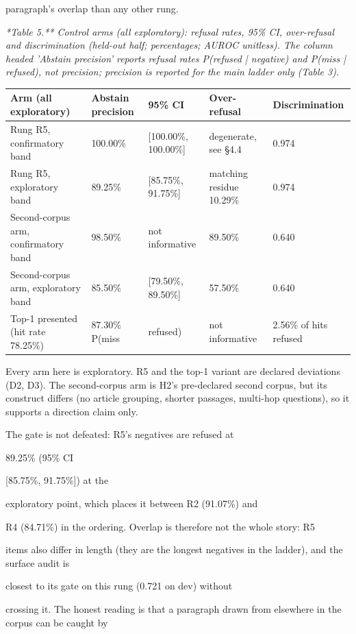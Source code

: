 paragraph's overlap than any other rung.

\textit{*Table 5.** Control arms (all exploratory): refusal rates, 95\% CI, over-refusal and discrimination (held-out half; percentages; AUROC unitless). The column headed 'Abstain precision' reports refusal rates P(refused | negative) and P(miss | refused), not precision; precision is reported for the main ladder only (Table 3).}

\begin{table}[t]
\centering
\scriptsize
  \begin{tabularx}{\textwidth}{lXXXX}
    \toprule
    Arm (all exploratory) & Abstain precision & 95\% CI & Over-refusal & Discrimination \\
\midrule
    Rung R5, confirmatory band & 100.00\% & [100.00\%, 100.00\%] & degenerate, see §4.4 & 0.974 \\
    Rung R5, exploratory band & 89.25\% & [85.75\%, 91.75\%] & matching residue 10.29\% & 0.974 \\
    Second-corpus arm, confirmatory band & 98.50\% & not informative & 89.50\% & 0.640 \\
    Second-corpus arm, exploratory band & 85.50\% & [79.50\%, 89.50\%] & 57.50\% & 0.640 \\
    Top-1 presented (hit rate 78.25\%) & 87.30\% P(miss & refused) & not informative & 2.56\% of hits refused \\
    \bottomrule
  \end{tabularx}
\end{table}
Every arm here is exploratory. R5 and the top-1 variant are declared deviations (D2, D3). The second-corpus arm is H2's pre-declared second corpus, but its construct differs (no article grouping, shorter passages, multi-hop questions), so it supports a direction claim only.

The gate is not defeated: R5's negatives are refused at

89.25\% (95\% CI

[85.75\%, 91.75\%]) at the

exploratory point, which places it between R2 (91.07\%) and

R4 (84.71\%) in the ordering. Overlap is therefore not the whole story: R5

items also differ in length (they are the longest negatives in the ladder), and the surface audit is

closest to its gate on this rung (0.721 on dev) without

crossing it. The honest reading is that a paragraph drawn from elsewhere in the corpus can be caught by

